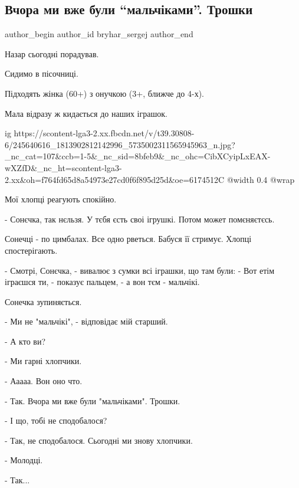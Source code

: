  
 
 
 
 
 
\subsection{Вчора ми вже були \enquote{мальчіками}. Трошки}
\label{sec:19_10_2021.fb.bryhar_sergej.1.malchiki}
 
\ifcmt
 author_begin
   author_id bryhar_sergej
 author_end
\fi

Назар сьогодні порадував.

Сидимо в пісочниці.

Підходять жінка (60+) з онучкою (3+, ближче до 4-х). 

Мала відразу ж кидається до наших іграшок.

\ifcmt
  ig https://scontent-lga3-2.xx.fbcdn.net/v/t39.30808-6/245640616_1813902812142996_5735002311565945963_n.jpg?_nc_cat=107&ccb=1-5&_nc_sid=8bfeb9&_nc_ohc=CibXCyipLxEAX-wXZfD&_nc_ht=scontent-lga3-2.xx&oh=f764fd65d8a54973e27cd0f6f895d25d&oe=6174512C
  @width 0.4
  @wrap 
\fi

Мої хлопці реагують спокійно.

- Сонєчка, так нєльзя. У тєбя єсть своі ігрушкі. Потом может помєняєтєсь.

Сонечці - по цимбалах. Все одно рветься. Бабуся її стримує. Хлопці спостерігають.

- Смотрі, Сонєчка, - вивалює з сумки всі іграшки, що там були: - Вот етім іграєшся ти, - показує пальцем, - а вон тєм - мальчікі.

Сонечка зупиняється.

- Ми не "мальчікі", - відповідає мій старший.

- А кто ви?

- Ми гарні хлопчики.

- Ааааа. Вон оно что.

- Так. Вчора ми вже були "мальчіками". Трошки.

- І що, тобі не сподобалося?

- Так, не сподобалося. Сьогодні ми знову хлопчики.

- Молодці.

- Так...
